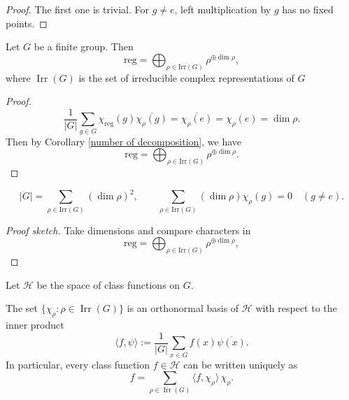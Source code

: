 \begin{proof}
The first one is trivial. For \(g \neq e\), left multiplication by \(g\) has no fixed points.
\end{proof}

\begin{thm}
\label{the decomposition of the regular representation}
Let $G$ be a finite group. Then \[
\mathrm{reg} = \bigoplus_{\rho \in \mathrm{Irr}(G)} \rho^{\oplus \dim \rho},
\]
where $\operatorname{Irr}(G)$ is the set of irreducible complex representations of $G$
\end{thm}

\begin{proof}
\[
\frac{1}{|G|} \sum_{g \in G} \chi_{\mathrm{reg}}(g) \overline{\chi_\rho(g)}
= \overline{\chi_\rho(e)}=\chi_\rho(e)
= \dim \rho.
\]
Then by Corollary \ref{number of decomposition}, we have \[
\mathrm{reg} = \bigoplus_{\rho \in \mathrm{Irr}(G)} \rho^{\oplus \dim \rho}.
\]
\end{proof}

\begin{cor}\label{cor:take dim  decomposition reg}
\[
|G| = \sum_{\rho \in \mathrm{Irr}(G)} (\dim \rho)^2, \qquad
\sum_{\rho \in \mathrm{Irr}(G)} (\dim \rho) \chi_\rho(g) = 0 \quad (g \neq e).
\]
\end{cor}

\begin{proof}[Proof sketch]
Take dimensions and compare characters in \[
\mathrm{reg} = \bigoplus_{\rho \in \mathrm{Irr}(G)} \rho^{\oplus \dim \rho},
\]
\end{proof}

\begin{thm}
\label{thm:basis_class_functions}

Let $\mathcal H$ be the space of class functions on \(G\). 

The set \(\{\chi_\rho : \rho \in \operatorname{Irr}(G)\}\) is an orthonormal basis of \(\mathcal H\) with respect to the inner product
\[
\langle f, \psi \rangle := \frac{1}{|G|} \sum_{x \in G} f(x) \overline{\psi(x)}.
\]
In particular, every class function \(f \in \mathcal H\) can be written uniquely as
\[
f = \sum_{\rho \in \operatorname{Irr}(G)} \langle f, \chi_\rho \rangle \, \chi_\rho.
\]
\end{thm}

